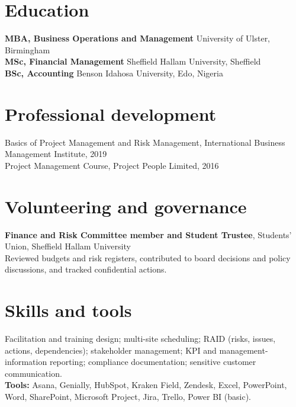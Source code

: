 \documentclass[10.5pt,a4paper]{article}
\begin{document}
\section*{Education}
\textbf{MBA, Business Operations and Management} \hfill University of Ulster, Birmingham\\
\textbf{MSc, Financial Management} \hfill Sheffield Hallam University, Sheffield\\
\textbf{BSc, Accounting} \hfill Benson Idahosa University, Edo, Nigeria

\section*{Professional development}
Basics of Project Management and Risk Management, International Business Management Institute, 2019\\
Project Management Course, Project People Limited, 2016

\section*{Volunteering and governance}
\textbf{Finance and Risk Committee member and Student Trustee}, Students' Union, Sheffield Hallam University\\
Reviewed budgets and risk registers, contributed to board decisions and policy discussions, and tracked confidential actions.

\section*{Skills and tools}
Facilitation and training design; multi-site scheduling; RAID (risks, issues, actions, dependencies); stakeholder management; KPI and management-information reporting; compliance documentation; sensitive customer communication.\\[0.25em]
\textbf{Tools:} Asana, Genially, HubSpot, Kraken Field, Zendesk, Excel, PowerPoint, Word, SharePoint, Microsoft Project, Jira, Trello, Power BI (basic).
\end{document}
